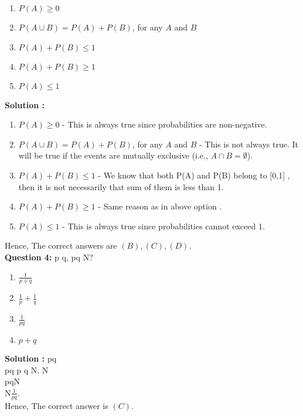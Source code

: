 \documentclass[10pt]{article}
\begin{document}
\begin{enumerate}[label =(\Alph*)]
    \item \(P(A) \geq 0\)
    \item \(P(A \cup B) = P(A) + P(B)\), for any \(A\) and \(B\)
    \item \(P(A) + P(B) \leq 1\)
    \item \(P(A) + P(B) \geq 1\)
    \item \(P(A) \leq 1\)
\end{enumerate}

\textbf{Solution :}
\begin{enumerate}[label=(\Alph*)]
    \item \(P(A) \geq 0\) - This is always true since probabilities are non-negative.
    \item \(P(A \cup B) = P(A) + P(B)\), for any \(A\) and \(B\) - This is not always true. It will be true if the events are mutually exclusive (i.e., \(A \cap B = \emptyset\)).
    \item \(P(A) + P(B) \leq 1\) - We know that both P(A) and P(B) belong to [0,1] , then it is not necessarily that sum of them is less than 1.
    \item \(P(A) + P(B) \geq 1\) - Same reason as in above option .
    \item \(P(A) \leq 1\) - This is always true since probabilities cannot exceed 1.
\end{enumerate}
Hence, The correct answers are $(B), (C), (D).$
\\

\textbf{Question 4:}  p  q,  pq 
 N?
\begin{enumerate}[label= (\Alph*)]
    \item $\frac{1}{p+q}$
    \item $\frac{1}{p} + \frac{1}{q}$
    \item $\frac{1}{pq}$
    \item $p+q$
\end{enumerate}

\textbf{Solution :} pq\\
pq
 p  q  N. N\\
pqN
\\
N$\frac{1}{pq}$.\\
Hence, The correct answer is $(C)$.
\\
\end{document}

